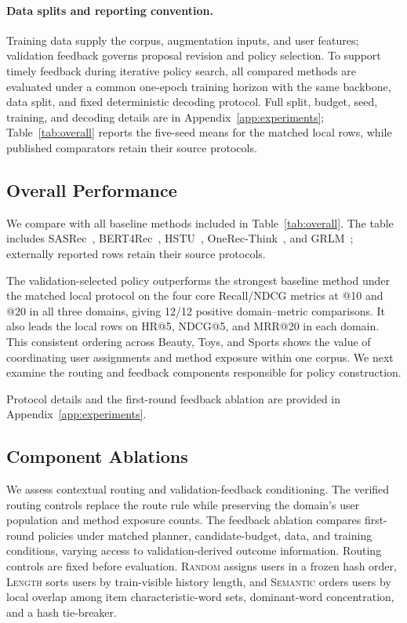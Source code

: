 \paragraph{Data splits and reporting convention.}
Training data supply the corpus, augmentation inputs, and user features; validation feedback governs proposal revision and policy selection. To support timely feedback during iterative policy search, all compared methods are evaluated under a common one-epoch training horizon with the same backbone, data split, and fixed deterministic decoding protocol. Full split, budget, seed, training, and decoding details are in Appendix~\ref{app:experiments}; Table~\ref{tab:overall} reports the five-seed means for the matched local rows, while published comparators retain their source protocols.

\subsection{Overall Performance}
\label{sec:overall-performance}

We compare \method{} with all baseline methods included in Table~\ref{tab:overall}. The table includes SASRec~\citep{kang2018self}, BERT4Rec~\citep{sun2019bert4rec}, HSTU~\citep{zhai2024actions}, OneRec-Think~\citep{liu2025onerec_think}, and GRLM~\citep{zhang2026grlm}; externally reported rows retain their source protocols.

The validation-selected \method{} policy outperforms the strongest baseline method under the matched local protocol on the four core Recall/NDCG metrics at @10 and @20 in all three domains, giving 12/12 positive domain--metric comparisons. It also leads the local rows on HR@5, NDCG@5, and MRR@20 in each domain. This consistent ordering across Beauty, Toys, and Sports shows the value of coordinating user assignments and method exposure within one corpus. We next examine the routing and feedback components responsible for policy construction.

Protocol details and the first-round feedback ablation are provided in Appendix~\ref{app:experiments}.

\subsection{Component Ablations}
\label{sec:component-ablation}

We assess contextual routing and validation-feedback conditioning. The verified routing controls replace the route rule while preserving the domain's user population and method exposure counts. The feedback ablation compares first-round policies under matched planner, candidate-budget, data, and training conditions, varying access to validation-derived outcome information. Routing controls are fixed before evaluation. \textsc{Random} assigns users in a frozen hash order, \textsc{Length} sorts users by train-visible history length, and \textsc{Semantic} orders users by local overlap among item characteristic-word sets, dominant-word concentration, and a hash tie-breaker.


